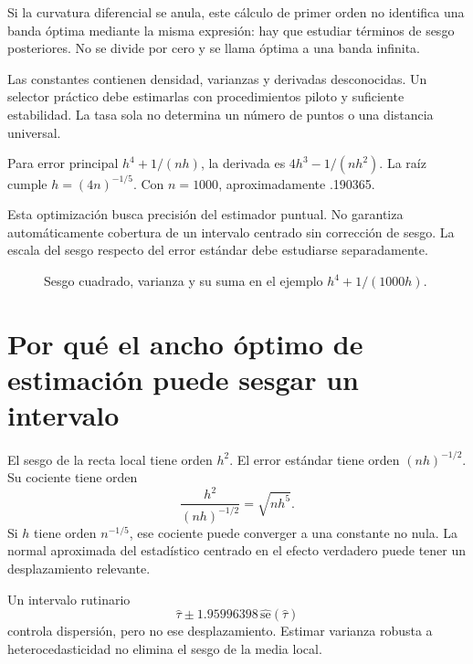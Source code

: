 \documentclass[11pt,a4paper]{article}
\begin{document}
Si la curvatura diferencial se anula,
este cálculo de primer orden no identifica
una banda óptima mediante la misma expresión:
hay que estudiar términos de sesgo posteriores.
No se divide por cero y se llama
óptima a una banda infinita.

Las constantes contienen densidad,
varianzas y derivadas desconocidas.
Un selector práctico debe estimarlas
con procedimientos piloto y suficiente estabilidad.
La tasa sola no determina un número
de puntos o una distancia universal.

\begin{ejemplo}
Para error principal \(h^4+1/(nh)\),
la derivada es \(4h^3-1/(nh^2)\).
La raíz cumple \(h=(4n)^{-1/5}\).
Con \(n=1000\), aproximadamente .190365.
\end{ejemplo}
Esta optimización busca precisión del estimador puntual.
No garantiza automáticamente cobertura
de un intervalo centrado sin corrección de sesgo.
La escala del sesgo respecto del error estándar
debe estudiarse separadamente.

\begin{figure}[H]\centering
{}
\caption{Sesgo cuadrado, varianza y su suma en el ejemplo \(h^4+1/(1000h)\).}
\end{figure}

\clearpage
\section{Por qué el ancho óptimo de estimación puede sesgar un intervalo}\label{unidad36}
El sesgo de la recta local tiene orden \(h^2\).
El error estándar tiene orden \((nh)^{-1/2}\).
Su cociente tiene orden
\[
\frac{h^2}{(nh)^{-1/2}}=\sqrt{nh^5}.
\]
Si \(h\) tiene orden \(n^{-1/5}\),
ese cociente puede converger a una constante no nula.
La normal aproximada del estadístico
centrado en el efecto verdadero puede
tener un desplazamiento relevante.

Un intervalo rutinario
\[
\widehat\tau\pm1.95996398\,
\widehat{\mathrm{se}}(\widehat\tau)
\]
controla dispersión, pero no ese desplazamiento.
Estimar varianza robusta a heterocedasticidad
no elimina el sesgo de la media local.
\end{document}
